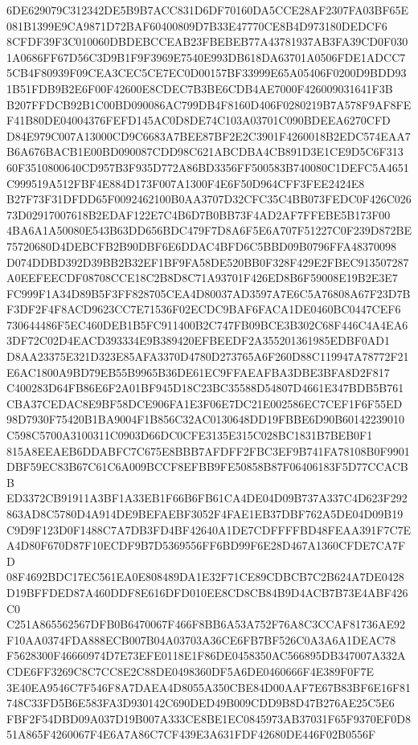 \documentclass[UTF8,fontset=fandol,zihao=-4,a4paper]{ctexart}
\begin{document}
{{6DE629079C312342DE5B9B7ACC831D6DF70160DA5CCE28AF2307FA03BF65E081B1399E9CA9871D72BAF60400809D7B33E47770CE8B4D973180DEDCF6
8CFDF39F3C010060DBDEBCCEAB23FBEBEB77A43781937AB3FA39CD0F0301A0686FF67D56C3D9B1F9F3969E7540E993DB618DA63701A0506FDE1ADCC7
5CB4F80939F09CEA3CEC5CE7EC0D00157BF33999E65A05406F0200D9BDD931B51FDB9B2E6F00F42600E8CDEC7B3BE6CDB4AE7000F426009031641F3B
B207FFDCB92B1C00BD090086AC799DB4F8160D406F0280219B7A578F9AF8FEF41B80DE04004376FEFD145AC0D8DE74C103A03701C090BDEEA6270CFD
D84E979C007A13000CD9C6683A7BEE87BF2E2C3901F4260018B2EDC574EAA7B6A676BACB1E00BD090087CDD98C621ABCDBA4CB891D3E1CE9D5C6F313
60F3510800640CD957B3F935D772A86BD3356FF500583B740080C1DEFC5A4651C999519A512FBF4E884D173F007A1300F4E6F50D964CFF3FEE2424E8
B27F73F31DFDD65F0092462100B0AA3707D32CFC35C4BB073FEDC0F426C02673D02917007618B2EDAF122E7C4B6D7B0BB73F4AD2AF7FFEBE5B173F00
4BA6A1A50080E543B63DD656BDC479F7D8A6F5E6A707F51227C0F239D872BE75720680D4DEBCFB2B90DBF6E6DDAC4BFD6C5BBD09B0796FFA48370098
D074DDBD392D39BB2B32EF1BF9FA58DE520BB0F328F429E2FBEC913507287A0EEFEECDF08708CCE18C2B8D8C71A93701F426ED8B6F59008E19B2E3E7
FC999F1A34D89B5F3FF828705CEA4D80037AD3597A7E6C5A76808A67F23D7BF3DF2F4F8ACD9623CC7E71536F02ECDC9BAF6FACA1DE0460BC0447CEF6
730644486F5EC460DEB1B5FC911400B2C747FB09BCE3B302C68F446C4A4EA63DF72C02D4EACD393334E9B389420EFBEEDF2A355201361985EDBF0AD1
D8AA23375E321D323E85AFA3370D4780D273765A6F260D88C119947A78772F21E6AC1800A9BD79EB55B9965B36DE61EC9FFAEAFBA3DBE3BFA8D2F817
C400283D64FB86E6F2A01BF945D18C23BC35588D54807D4661E347BDB5B761CBA37CEDAC8E9BF58DCE906FA1E3F06E7DC21E002586EC7CEF1F6F55ED
98D7930F75420B1BA9004F1B856C32AC0130648DD19FBBE6D90B60142239010C598C5700A3100311C0903D66DC0CFE3135E315C028BC1831B7BEB0F1
815A8EEAEB6DDABFC7C675E8BBB7AFDFF2FBC3EF9B741FA78108B0F9901DBF59EC83B67C61C6A009BCCF8EFBB9FE50858B87F06406183F5D77CCACBB
ED3372CB91911A3BF1A33EB1F66B6FB61CA4DE04D09B737A337C4D623F292863AD8C5780D4A914DE9BEFAEBF3052F4FAE1EB37DBF762A5DE04D09B19
C9D9F123D0F1488C7A7DB3FD4BF42640A1DE7CDFFFFBD48FEAA391F7C7EA4D80F670D87F10ECDF9B7D5369556FF6BD99F6E28D467A1360CFDE7CA7FD
08F4692BDC17EC561EA0E808489DA1E32F71CE89CDBCB7C2B624A7DE0428D19BFFDED87A460DDF8E616DFD010EE8CD8CB84B9D4ACB7B73E4ABF426C0
C251A865562567DFB0B6470067F466F8BB6A53A752F76A8C3CCAF81736AE92F10AA0374FDA888ECB007B04A03703A36CE6FB7BF526C0A3A6A1DEAC78
F5628300F46660974D7E73EFE0118E1F86DE0458350AC566895DB347007A332ACDE6FF3269C8C7CC8E2C88DE0498360DF5A6DE0460666F4E389F0F7E
3E40EA9546C7F546F8A7DAEA4D8055A350CBE84D00AAF7E67B83BF6E16F81748C33FD5B6E583FA3D930142C690DED49B009CDD9B8D47B276AE25C5E6
FBF2F54DBD09A037D19B007A333CE8BE1EC0845973AB37031F65F9370EF0D851A865F4260067F4E6A7A86C7CF439E3A631FDF42680DE446F02B0556F
}}
\end{document}
